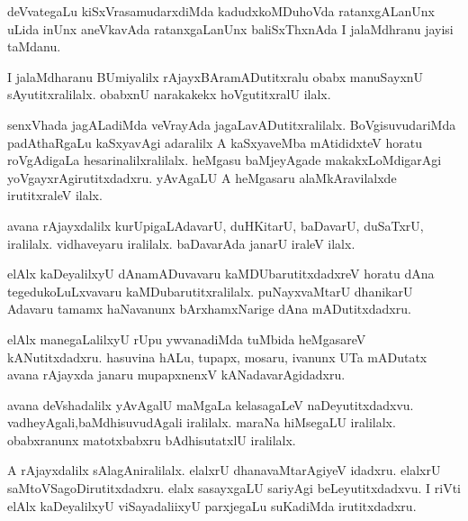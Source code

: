 \documentclass{article}
\begin{document}
\begin{mn}%
deVvategaLu kiSxVrasamudarxdiMda kadudxkoMDuhoVda ratanxgALanUnx uLida inUnx aneVkavAda 
ratanxgaLanUnx baliSxThxnAda I jalaMdhranu jayisi taMdanu.
\end{mn}

\begin{mn}%
I jalaMdharanu BUmiyalilx rAjayxBAramADutitxralu obabx manuSayxnU sAyutitxralilalx. obabxnU 
narakakekx hoVgutitxralU ilalx.
\end{mn}

\begin{mn}%
senxVhada jagALadiMda veVrayAda jagaLavADutitxralilalx. BoVgisuvudariMda padAthaRgaLu 
kaSxyavAgi adaralilx A kaSxyaveMba mAtididxteV horatu roVgAdigaLa hesarinalilxralilalx. 
heMgasu baMjeyAgade makakxLoMdigarAgi yoVgayxrAgirutitxdadxru. yAvAgaLU A heMgasaru 
alaMkAravilalxde irutitxraleV ilalx.
\end{mn}

\begin{mn}%
avana rAjayxdalilx kurUpigaLAdavarU, duHKitarU, baDavarU, duSaTxrU, iralilalx. vidhaveyaru 
iralilalx. baDavarAda janarU iraleV ilalx.
\end{mn}

\begin{mn}%
elAlx kaDeyalilxyU dAnamADuvavaru kaMDUbarutitxdadxreV horatu dAna tegedukoLuLxvavaru 
kaMDubarutitxralilalx. puNayxvaMtarU dhanikarU Adavaru tamamx haNavanunx bArxhamxNarige 
dAna mADutitxdadxru.
\end{mn}

\begin{mn}%
elAlx manegaLalilxyU rUpu ywvanadiMda tuMbida heMgasareV kANutitxdadxru. hasuvina hALu, 
tupapx, mosaru, ivanunx UTa mADutatx avana rAjayxda janaru mupapxnenxV kANadavarAgidadxru.
\end{mn}

\begin{mn}%
avana deVshadalilx yAvAgalU maMgaLa kelasagaLeV naDeyutitxdadxvu. 
vadheyAgali,baMdhisuvudAgali iralilalx. maraNa hiMsegaLU iralilalx. obabxranunx 
matotxbabxru bAdhisutatxlU iralilalx.
\end{mn}

\begin{mn}%
A rAjayxdalilx sAlagAniralilalx. elalxrU dhanavaMtarAgiyeV idadxru. elalxrU 
saMtoVSagoDirutitxdadxru. elalx sasayxgaLU sariyAgi beLeyutitxdadxvu. I riVti elAlx 
kaDeyalilxyU viSayadaliixyU parxjegaLu suKadiMda irutitxdadxru.
\end{mn}
\end{document}
